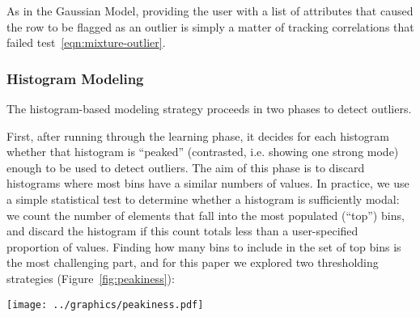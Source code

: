 As in the Gaussian Model, providing the user with a list of attributes that caused the row to be flagged as an outlier is simply a matter of tracking correlations that failed test~\ref{eqn:mixture-outlier}.

\subsubsection{Histogram Modeling}
The histogram-based modeling strategy proceeds in two phases to detect outliers.

First, after running through the learning phase, it decides for each histogram whether that histogram is ``peaked'' (contrasted, i.e. showing one strong mode) enough to be used to detect outliers. The aim of this phase is to discard histograms where most bins have a similar numbers of values. In practice, we use a simple statistical test to determine whether a histogram is sufficiently modal: we count the number of elements that fall into the most populated (``top'') bins, and discard the histogram if this count totals less than a user-specified proportion of values. Finding how many bins to include in the set of top bins is the most challenging part, and for this paper we explored two thresholding strategies (Figure~\ref{fig:peakiness}):

\begin{figure*}
  \centering
  \texttt{[image: ../graphics/peakiness.pdf]}\vspace{0.5em}
  \caption{Sample histograms, and corresponding decisions with distribution-dependent (\(D\)-independent) and distribution-independent (\(D\)-independent) thresholds. Each figure shows a sorted histogram, with the top bins hatched (in dotted green in the distribution-independent case, and in solid orange in the distribution-dependent case). The vertical arrows show the small value \(r=3\) in the distribution-dependent case. The weaknesses of the distribution-independent-model show in the third and fourth plots: in the third one the distribution-dependent strategy correctly rejects because of the small \(r\); in the fourth the distribution-independent strategy yields an incorrect threshold.}
  \label{fig:peakiness}
\end{figure*}

